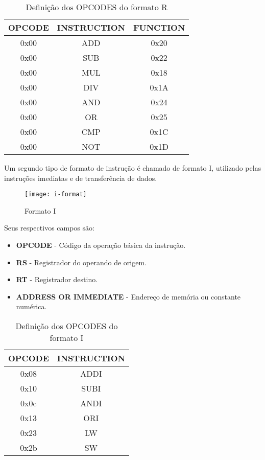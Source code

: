 \begin{table}[H]
\centering
	\begin{tabular}{|c|c|c|}
  	\hline 
  	\cellcolor[gray]{0.9}\textbf{OPCODE} & \cellcolor[gray]{0.9}\textbf{INSTRUCTION} & \cellcolor[gray]{0.9}\textbf{FUNCTION} \\ 
  	\hline 
  	0x00 & ADD & 0x20 \\ 
  	\hline 
  	0x00 & SUB & 0x22 \\ 
  	\hline 
  	0x00 & MUL & 0x18 \\ 
  	\hline 
  	0x00 & DIV & 0x1A \\ 
  	\hline 
  	0x00 & AND & 0x24 \\ 
  	\hline 
  	0x00 & OR & 0x25 \\ 
  	\hline 
  	0x00 & CMP & 0x1C \\ 
  	\hline 
  	0x00 & NOT & 0x1D \\ 
  	\hline 
  	\end{tabular} 
  	\caption{Definição dos OPCODES do formato R}
  \end{table} 
  	 	
  	
	 Um segundo tipo de formato de instrução é chamado de formato I, utilizado pelas instruções imediatas e de transferência de dados.
	\begin{figure}[H]
    	\centering
    	\texttt{[image: i-format]}
    	\caption{Formato I}
		\label{i_format}
  	\end{figure}
Seus respectivos campos são:
	\begin{itemize}
	\item \textbf{OPCODE} - Código da operação básica da instrução.
	\item \textbf{RS} - Registrador do operando de origem.
	\item \textbf{RT} - Registrador destino.
	\item \textbf{ADDRESS OR IMMEDIATE} - Endereço de memória ou constante numérica.
\end{itemize}	  	

\begin{table}[H]
\centering	
\begin{tabular}{|c|c|}
	\hline 
  	\cellcolor[gray]{0.9}\textbf{OPCODE} & \cellcolor[gray]{0.9}\textbf{INSTRUCTION} \\ 
	\hline 
	0x08 & ADDI \\ %
	\hline 
	0x10 & SUBI \\ %
	\hline 
	0x0c & ANDI \\ %
	\hline 
	0x13 & ORI \\ %
	\hline 
	0x23 & LW \\ %
	\hline 
	0x2b & SW \\ %
	\hline 
	\end{tabular} 
	  	\caption{Definição dos OPCODES do formato I}	
\end{table}	
	
